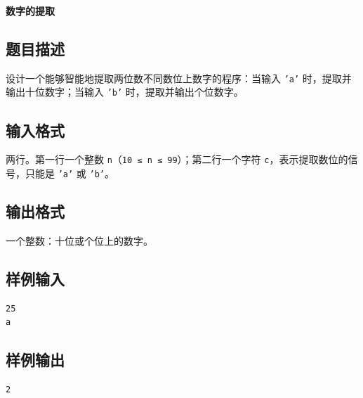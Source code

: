 \documentclass{article}
\newcommand{\problemname}[1]{\begin{center}\Large\bfseries #1\end{center}}
\begin{document}
\problemname{数字的提取}

\subsection*{题目描述}
设计一个能够智能地提取两位数不同数位上数字的程序：当输入 \texttt{'a'} 时，提取并输出十位数字；当输入 \texttt{'b'} 时，提取并输出个位数字。

\subsection*{输入格式}
两行。第一行一个整数 \texttt{n}（\texttt{10 ≤ n ≤ 99}）；第二行一个字符 \texttt{c}，表示提取数位的信号，只能是 \texttt{'a'} 或 \texttt{'b'}。

\subsection*{输出格式}
一个整数：十位或个位上的数字。

\subsection*{样例输入}
\begin{verbatim}
25
a
\end{verbatim}

\subsection*{样例输出}
\begin{verbatim}
2
\end{verbatim}
\end{document}
